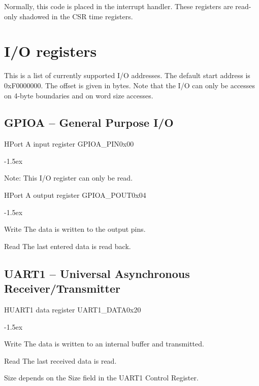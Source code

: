 \documentclass[12pt]{article}
\begin{document}
Normally, this code is placed in the interrupt handler. These registers are read-only shadowed in the CSR time registers.

\section{I/O registers}
\label{sec:ioregisters}
This is a list of currently supported I/O addresses. 
The default start address is 0xF0000000. The offset is given in bytes. Note that the I/O can only be accesses on 4-byte boundaries and on word size accesses.

\subsection{GPIOA -- General Purpose I/O}

\begin{register}{H}{Port A input register GPIOA\_PIN}{0x00}%
\label{pinx}%
\regnewline%
\end{register}
\begin{regdesc}[0.6\textwidth]\begin{reglist}[000000000]
\itemsep-1.5ex
\item[Note:] This I/O register can only be read.
\end{reglist}\end{regdesc}

\begin{register}{H}{Port A output register GPIOA\_POUT}{0x04}%
\label{poutx}%
\regnewline%
\end{register}
\begin{regdesc}[0.6\textwidth]\begin{reglist}[000000000]
\itemsep-1.5ex
\item[Write] The data is written to the output pins.
\item[Read] The last entered data is read back.
\end{reglist}\end{regdesc}

\subsection{UART1 -- Universal Asynchronous Receiver/Transmitter}

\begin{register}{H}{UART1 data register UART1\_DATA}{0x20}
\label{uart1data}
%
%
\regnewline%
\end{register}
\begin{regdesc}[0.6\textwidth]\begin{reglist}[000000000]
\itemsep-1.5ex
\item[Write] The data is written to an internal buffer and transmitted.
\item[Read] The last received data is read.
\end{reglist}\end{regdesc}
\hspace*{2cm}Size depends on the Size field in the UART1 Control Register.
\end{document}
